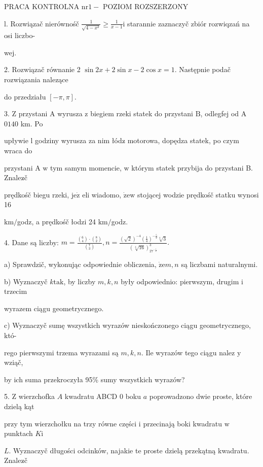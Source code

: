 \documentclass[a4paper,12pt]{article}
\begin{document}
PRACA KONTROLNA $\mathrm{n}\mathrm{r}1-$ POZIOM ROZSZERZONY

l. Rozwiązač nierównośč $\displaystyle \frac{1}{\sqrt{4-x^{2}}}\geq\frac{1}{x-1}\mathrm{i}$ starannie zaznaczyč zbiór rozwiqzań na osi liczbo-

wej.

2. Rozwiązač równanie 2 $\sin 2x+2\sin x-2\cos x=1$. Następnie podač rozwiązania nalezące

do przedziału $[-\pi,\pi].$

3. $\mathrm{Z}$ przystani A wyrusza $\mathrm{z}$ biegiem rzeki statek do przystani $\mathrm{B}$, odlegfej od A $0140$ km. Po

upływie l godziny wyrusza za nim łódz$\acute{}$ motorowa, dopędza statek, po czym wraca do

przystani A $\mathrm{w}$ tym samym momencie, $\mathrm{w}$ którym statek przybija do przystani B. Znalez$\acute{}$č

prędkośč biegu rzeki, $\mathrm{j}\mathrm{e}\dot{\mathrm{z}}$ eli wiadomo, $\dot{\mathrm{z}}\mathrm{e}\mathrm{w}$ stojącej wodzie prędkośč statku wynosi 16

$\mathrm{k}\mathrm{m}/$godz, a prędkośč łodzi 24 $\mathrm{k}\mathrm{m}/$godz.

4. Dane są liczby: $m=\displaystyle \frac{(_{4}^{6})\cdot(_{2}^{8})}{(_{3}^{7})}, n=\displaystyle \frac{(\sqrt{2})^{-4}(\frac{1}{4})^{-\frac{5}{2}}\sqrt[4]{3}}{(\sqrt[4]{16})_{27^{-\frac{1}{4}}}^{3}}.$

a) Sprawdzič, wykonując odpowiednie obliczenia, $\dot{\mathrm{z}}\mathrm{e}m, n$ są liczbami naturalnymi.

b) Wyznaczyč $k\mathrm{t}\mathrm{a}\mathrm{k}$, by liczby $m, k, n$ były odpowiednio: pierwszym, drugim $\mathrm{i}$ trzecim

wyrazem ciągu geometrycznego.

c) Wyznaczyč sumę wszystkich wyrazów nieskończonego ciągu geometrycznego, któ-

rego pierwszymi trzema wyrazami są $m, k, n$. Ile wyrazów tego ciągu nalez $\mathrm{y}$ wziąč,

by ich suma przekroczyła 95\% sumy wszystkich wyrazów?

5. $\mathrm{Z}$ wierzchofka $A$ kwadratu ABCD $0$ boku $a$ poprowadzono dwie proste, które dzielą kąt

przy tym wierzchołku na trzy równe części $\mathrm{i}$ przecinają boki kwadratu $\mathrm{w}$ punktach $K\mathrm{i}$

$L$. Wyznaczyč długości odcinków, najakie te proste dzielą przekątną kwadratu. Znalez$\acute{}$č
\end{document}
